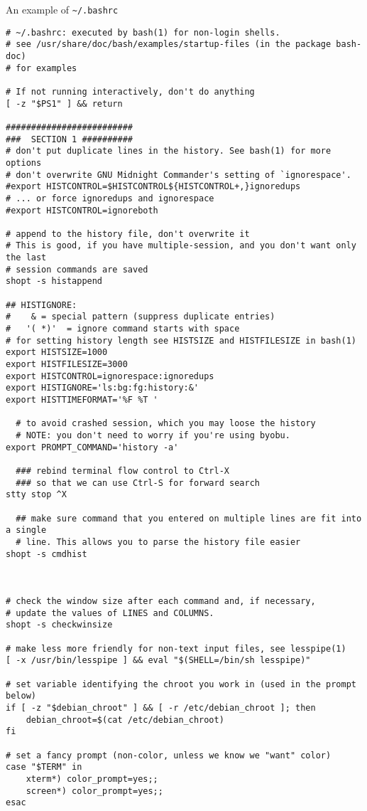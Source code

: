 An example of \verb!~/.bashrc!
{\small
\begin{verbatim}
# ~/.bashrc: executed by bash(1) for non-login shells.
# see /usr/share/doc/bash/examples/startup-files (in the package bash-doc)
# for examples

# If not running interactively, don't do anything
[ -z "$PS1" ] && return

#########################
###  SECTION 1 ##########
# don't put duplicate lines in the history. See bash(1) for more options
# don't overwrite GNU Midnight Commander's setting of `ignorespace'.
#export HISTCONTROL=$HISTCONTROL${HISTCONTROL+,}ignoredups
# ... or force ignoredups and ignorespace
#export HISTCONTROL=ignoreboth

# append to the history file, don't overwrite it
# This is good, if you have multiple-session, and you don't want only the last
# session commands are saved
shopt -s histappend

## HISTIGNORE:
#    & = special pattern (suppress duplicate entries)
#   '( *)'  = ignore command starts with space    
# for setting history length see HISTSIZE and HISTFILESIZE in bash(1)
export HISTSIZE=1000
export HISTFILESIZE=3000
export HISTCONTROL=ignorespace:ignoredups
export HISTIGNORE='ls:bg:fg:history:&'
export HISTTIMEFORMAT='%F %T '

  # to avoid crashed session, which you may loose the history 
  # NOTE: you don't need to worry if you're using byobu. 
export PROMPT_COMMAND='history -a'

  ### rebind terminal flow control to Ctrl-X
  ### so that we can use Ctrl-S for forward search
stty stop ^X
 
  ## make sure command that you entered on multiple lines are fit into a single
  # line. This allows you to parse the history file easier
shopt -s cmdhist



# check the window size after each command and, if necessary,
# update the values of LINES and COLUMNS.
shopt -s checkwinsize

# make less more friendly for non-text input files, see lesspipe(1)
[ -x /usr/bin/lesspipe ] && eval "$(SHELL=/bin/sh lesspipe)"

# set variable identifying the chroot you work in (used in the prompt below)
if [ -z "$debian_chroot" ] && [ -r /etc/debian_chroot ]; then
    debian_chroot=$(cat /etc/debian_chroot)
fi

# set a fancy prompt (non-color, unless we know we "want" color)
case "$TERM" in
    xterm*) color_prompt=yes;;
    screen*) color_prompt=yes;;
esac


\end{verbatim}}
